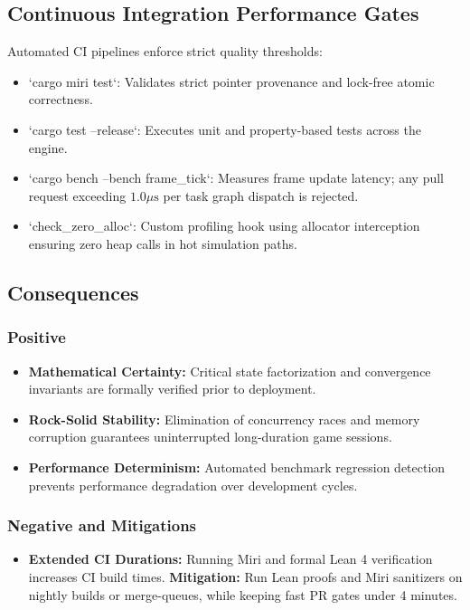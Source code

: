 \subsection{Continuous Integration Performance Gates}
Automated CI pipelines enforce strict quality thresholds:
\begin{itemize}
    \item `cargo miri test`: Validates strict pointer provenance and lock-free atomic correctness.
    \item `cargo test --release`: Executes unit and property-based tests across the engine.
    \item `cargo bench --bench frame_tick`: Measures frame update latency; any pull request exceeding $1.0\mu\text{s}$ per task graph dispatch is rejected.
    \item `check_zero_alloc`: Custom profiling hook using allocator interception ensuring zero heap calls in hot simulation paths.
\end{itemize}

\subsection{Consequences}
\subsubsection{Positive}
\begin{itemize}
    \item \textbf{Mathematical Certainty:} Critical state factorization and convergence invariants are formally verified prior to deployment.
    \item \textbf{Rock-Solid Stability:} Elimination of concurrency races and memory corruption guarantees uninterrupted long-duration game sessions.
    \item \textbf{Performance Determinism:} Automated benchmark regression detection prevents performance degradation over development cycles.
\end{itemize}

\subsubsection{Negative and Mitigations}
\begin{itemize}
    \item \textbf{Extended CI Durations:} Running Miri and formal Lean 4 verification increases CI build times. \textbf{Mitigation:} Run Lean proofs and Miri sanitizers on nightly builds or merge-queues, while keeping fast PR gates under 4 minutes.
\end{itemize}
